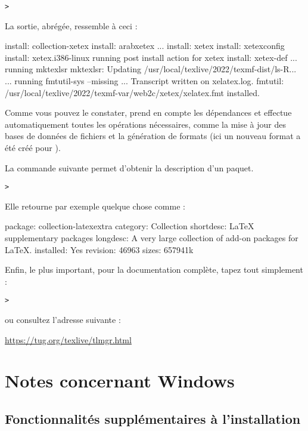\documentclass[german, english, french]{article}
\begin{document}
\begin{alltt}
> 
\end{alltt}
La sortie, abrégée, ressemble à ceci :
\begin{fverbatim}
install: collection-xetex
install: arabxetex
...
install: xetex
install: xetexconfig
install: xetex.i386-linux
running post install action for xetex
install: xetex-def
...
running mktexlsr
mktexlsr: Updating /usr/local/texlive/2022/texmf-dist/ls-R...
...
running fmtutil-sys --missing
...
Transcript written on xelatex.log.
fmtutil: /usr/local/texlive/2022/texmf-var/web2c/xetex/xelatex.fmt installed.
\end{fverbatim}
Comme vous pouvez le constater,  prend en compte les dépendances et
effectue automatiquement toutes les opérations nécessaires, comme la mise à jour
des bases de données de fichiers et la génération de formats (ici un nouveau
format a été créé pour \XeTeX).

La commande suivante permet d'obtenir la description d'un paquet.
\begin{alltt}
> 
\end{alltt}
Elle retourne par exemple quelque chose comme :
\begin{fverbatim}
package:    collection-latexextra
category:   Collection
shortdesc:  LaTeX supplementary packages
longdesc:   A very large collection of add-on packages for LaTeX.
installed:  Yes
revision:   46963
sizes:	    657941k
\end{fverbatim}

Enfin, le plus important, pour la documentation complète, tapez tout
simplement :
\begin{alltt}
> 
\end{alltt}
ou consultez l'adresse suivante :

\url{https://tug.org/texlive/tlmgr.html}

\section{Notes concernant Windows}
\label{sec:windows}

\subsection{Fonctionnalités supplémentaires à l'installation}
\label{sec:winfeatures}
\end{document}
